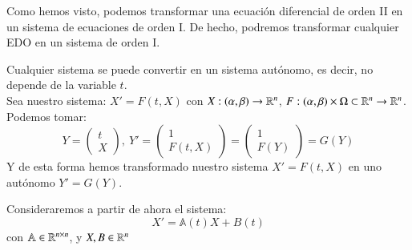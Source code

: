Como hemos visto, podemos transformar una ecuación diferencial de orden II en un sistema de ecuaciones de orden I. De hecho, podremos transformar cualquier EDO en un sistema de orden I.\\
\begin{obs}
    Cualquier sistema se puede convertir en un sistema autónomo, es decir, no depende de la variable $t$.\\
    Sea nuestro sistema: $X' = F(t, X)$ con $X: (\alpha, \beta) \to \mathbb{R}^n$, $F:(\alpha, \beta) \times \Omega \subset \mathbb{R}^n \to \mathbb{R}^n$. Podemos tomar:
    $$
        Y = \left(\begin{matrix}
            t\\
            X
    \end{matrix}\right),\ Y' = \left(\begin{matrix}
        1\\
        F(t, X)
    \end{matrix}\right) = \left(\begin{matrix}
        1\\
        F(Y)
    \end{matrix}\right) = G(Y)
    $$
    Y de esta forma hemos transformado nuestro sistema $X' = F(t, X)$ en uno autónomo $Y' = G(Y)$.
\end{obs}
Consideraremos a partir de ahora el sistema:
$$
    X' = \mathbb{A}(t) X + B(t)
$$
con $\mathbb{A} \in \mathbb{R}^{n\times n}$, y $X, B \in \mathbb{R}^{n}$
